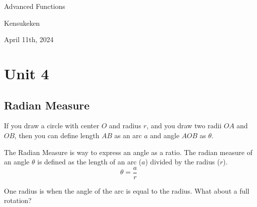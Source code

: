 \documentclass{article}
\begin{document}
\begin{titlepage}
    \centering
    \vspace*{2cm}
    {\LARGE \textcolor{lessoncolor}{Advanced Functions}}\par
    \vspace{1cm}
    {\large Kensukeken}\par
    \vspace{2cm}
    {\large April 11th, 2024}\par
    \vspace{3cm}
\end{titlepage}
\tableofcontents
\newpage
\section{Unit 4}
\subsection{Radian Measure}
If you draw a circle with center $O$ and radius $r$, and you draw two radii $OA$ and $OB$, then you can define length $AB$ as an arc $a$ and angle $AOB$ as $\theta$.

The Radian Measure is way to express an angle as a ratio. The radian measure of an angle $\theta$ is defined as the length of an arc ($a$) divided by the radius ($r$). 
$$\theta=\frac{a}{r}$$

One radius is when the angle of the arc is equal to the radius. What about a full rotation?
\end{document}
